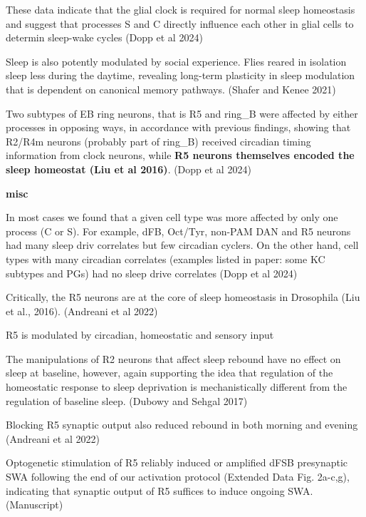 These data indicate that the glial clock is required for normal sleep homeostasis and
suggest that processes S and C directly influence each other in glial cells to determin
sleep-wake cycles (Dopp et al 2024)

Sleep is also potently modulated by social experience. Flies reared in isolation sleep less during
the daytime, revealing long-term plasticity in sleep modulation that is dependent on canonical memory pathways.
\parencite{shaferRegulationDrosophilaSleep2021} (Shafer and Kenee 2021)


Two subtypes of EB ring neurons, that is R5 and ring\_B were affected by either processes in opposing ways, in
    accordance with previous findings, showing that R2/R4m neurons (probably part of ring\_B) received circadian timing
    information from clock neurons, while \textbf{R5 neurons themselves encoded the sleep homeostat (Liu et al 2016)}.
    (Dopp et al 2024)

\noindent\hrulefill


\textbf{misc}

In most cases we found that a given cell type was more affected by only
one process (C or S). For example, dFB, Oct/Tyr, non-PAM DAN and R5 neurons
had many sleep driv correlates but few circadian cyclers. On the
other hand, cell types with many circadian correlates (examples listed
in paper: some KC subtypes and PGs) had no sleep drive correlates
(Dopp et al 2024)

Critically, the R5 neurons are at the core of sleep homeostasis in Drosophila (Liu et al., 2016).
\parencite{andreaniCircadianProgrammingEllipsoid2022} (Andreani et al 2022)

R5 is modulated by circadian, homeostatic and sensory input \parencite{raccugliaNetworkSpecificSynchronizationElectrical2019}

The manipulations of R2 neurons that affect sleep rebound have no effect on sleep at 
baseline, however, again supporting the idea that regulation of the
homeostatic response to sleep deprivation is mechanistically different from the regulation
of baseline sleep.
\parencite{dubowyCircadianRhythmsSleep2017} (Dubowy and Sehgal 2017)

Blocking R5 synaptic output also reduced rebound in both morning and evening
\parencite{andreaniCircadianProgrammingEllipsoid2022} (Andreani et al 2022)

Optogenetic stimulation of R5 reliably induced or amplified dFSB presynaptic SWA
following the end of our activation protocol (Extended Data Fig. 2a-c,g), indicating that
synaptic output of R5 suffices to induce ongoing SWA.
\parencite{raccugliaCoherentMultilevelNetwork2022} (Manuscript)


